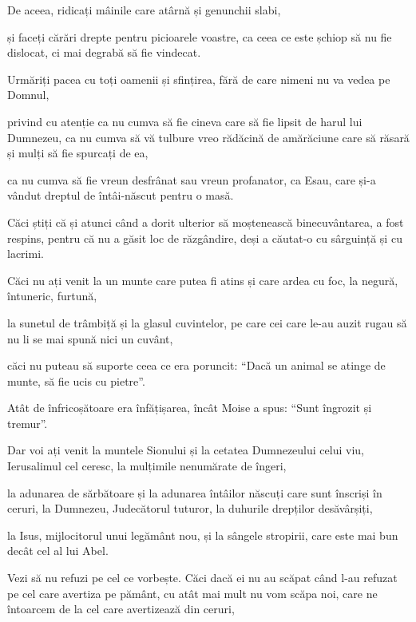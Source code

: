 {De aceea, ridicați mâinile care atârnă și genunchii slabi,

și faceți cărări drepte pentru picioarele voastre, ca ceea ce este șchiop să nu fie dislocat, ci mai degrabă să fie vindecat.


\par }{\PP {}Urmăriți pacea cu toți oamenii și sfințirea, fără de care nimeni nu va vedea pe Domnul,

privind cu atenție ca nu cumva să fie cineva care să fie lipsit de harul lui Dumnezeu, ca nu cumva să vă tulbure vreo rădăcină de amărăciune care să răsară și mulți să fie spurcați de ea,

ca nu cumva să fie vreun desfrânat sau vreun profanator, ca Esau, care și-a vândut dreptul de întâi-născut pentru o masă.

Căci știți că și atunci când a dorit ulterior să moștenească binecuvântarea, a fost respins, pentru că nu a găsit loc de răzgândire, deși a căutat-o cu sârguință și cu lacrimi.


\par }{\PP {}Căci nu ați venit la un munte care putea fi atins și care ardea cu foc, la negură, întuneric, furtună,

la sunetul de trâmbiță și la glasul cuvintelor, pe care cei care le-au auzit rugau să nu li se mai spună nici un cuvânt,

căci nu puteau să suporte ceea ce era poruncit: “Dacă un animal se atinge de munte, să fie ucis cu pietre”.

Atât de înfricoșătoare era înfățișarea, încât Moise a spus: “Sunt îngrozit și tremur”.


\par }{\PP {}Dar voi ați venit la muntele Sionului și la cetatea Dumnezeului celui viu, Ierusalimul cel ceresc, la mulțimile nenumărate de îngeri,

la adunarea de sărbătoare și la adunarea întâilor născuți care sunt înscriși în ceruri, la Dumnezeu, Judecătorul tuturor, la duhurile drepților desăvârșiți,

la Isus, mijlocitorul unui legământ nou, și la sângele stropirii, care este mai bun decât cel al lui Abel.


\par }{\PP {}Vezi să nu refuzi pe cel ce vorbește. Căci dacă ei nu au scăpat când l-au refuzat pe cel care avertiza pe pământ, cu atât mai mult nu vom scăpa noi, care ne întoarcem de la cel care avertizează din ceruri,

}
